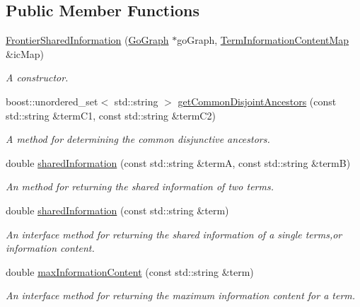 \subsection*{Public Member Functions}
\begin{DoxyCompactItemize}
\item 
\hyperlink{classFrontierSharedInformation_afd55b315f784ea9991adaa5320108891}{Frontier\+Shared\+Information} (\hyperlink{classGoGraph}{Go\+Graph} $\ast$go\+Graph, \hyperlink{classTermInformationContentMap}{Term\+Information\+Content\+Map} \&ic\+Map)
\begin{DoxyCompactList}\small\item\em A constructor. \end{DoxyCompactList}\item 
boost\+::unordered\+\_\+set$<$ std\+::string $>$ \hyperlink{classFrontierSharedInformation_a4c9a919ae92d7628bbb5c58ab06c19aa}{get\+Common\+Disjoint\+Ancestors} (const std\+::string \&term\+C1, const std\+::string \&term\+C2)
\begin{DoxyCompactList}\small\item\em A method for determining the common disjunctive ancestors. \end{DoxyCompactList}\item 
double \hyperlink{classFrontierSharedInformation_afd0bf3ea7bb9f4f05f89cc2597bc2dcf}{shared\+Information} (const std\+::string \&termA, const std\+::string \&termB)
\begin{DoxyCompactList}\small\item\em An method for returning the shared information of two terms. \end{DoxyCompactList}\item 
double \hyperlink{classFrontierSharedInformation_a7d9c15e312667dc5ac2af1c7e36f735b}{shared\+Information} (const std\+::string \&term)
\begin{DoxyCompactList}\small\item\em An interface method for returning the shared information of a single terms,or information content. \end{DoxyCompactList}\item 
double \hyperlink{classFrontierSharedInformation_a8301888fc7343848a9ee307849e49125}{max\+Information\+Content} (const std\+::string \&term)
\begin{DoxyCompactList}\small\item\em An interface method for returning the maximum information content for a term. \end{DoxyCompactList}\item 

\end{DoxyCompactItemize}
